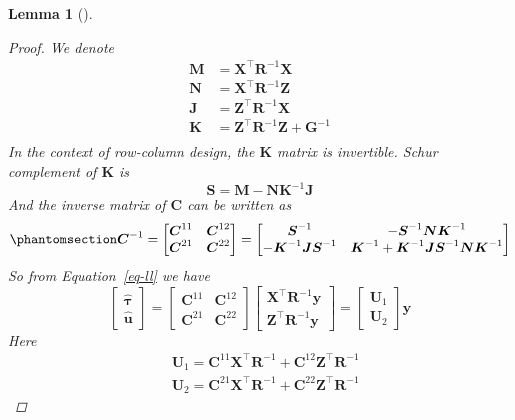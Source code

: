 \documentclass[
  a4paper,
  oneside,
  openany,
  12pt,
  onecolumn]{book}
\theoremstyle{definition}
\theoremstyle{definition}
\theoremstyle{plain}
\newtheorem{lemma}{Lemma}[chapter]
\theoremstyle{remark}
\begin{document}
\begin{lemma}[]
\begin{proof}
We denote \[\begin{aligned}
\boldsymbol{M} &= \boldsymbol{X}^\top \boldsymbol{R}^{-1} \boldsymbol{X}\\
\boldsymbol{N} &= \boldsymbol{X}^\top \boldsymbol{R}^{-1} \boldsymbol{Z}\\
\boldsymbol{J} &= \boldsymbol{Z}^\top \boldsymbol{R}^{-1} \boldsymbol{X}\\
\boldsymbol{K} &= \boldsymbol{Z}^\top \boldsymbol{R}^{-1} \boldsymbol{Z} + \boldsymbol{G}^{-1}\\
\end{aligned}\] In the context of row-column design, the
\(\boldsymbol{K}\) matrix is invertible. Schur complement of
\(\boldsymbol{K}\) is \[
\boldsymbol{S} = \boldsymbol{M} - \boldsymbol{N} \boldsymbol{K}^{-1} \boldsymbol{J}
\] And the inverse matrix of \(\boldsymbol{C}\) can be written as
\begin{equation}\phantomsection\label{eq-iv}{
\boldsymbol{C}^{-1}=
\begin{bmatrix}
\boldsymbol{C}^{11} & \boldsymbol{C}^{12} \\
\boldsymbol{C}^{21} & \boldsymbol{C}^{22}
\end{bmatrix}=
\begin{bmatrix}
\boldsymbol{S}^{-1} & -\boldsymbol{S}^{-1} \boldsymbol{N} \boldsymbol{K}^{-1} \\
-\boldsymbol{K}^{-1} \boldsymbol{J} \boldsymbol{S}^{-1} & \boldsymbol{K}^{-1} + \boldsymbol{K}^{-1} \boldsymbol{J} \boldsymbol{S}^{-1} \boldsymbol{N} \boldsymbol{K}^{-1}
\end{bmatrix}
}\end{equation} So from Equation~\ref{eq-ll} we have \[
\begin{bmatrix}
\hat{\boldsymbol{\tau}} \\
\hat{\boldsymbol{u}}
\end{bmatrix}
=
\begin{bmatrix}
\boldsymbol{C}^{11} & \boldsymbol{C}^{12} \\
\boldsymbol{C}^{21} & \boldsymbol{C}^{22}
\end{bmatrix}
\begin{bmatrix}
\boldsymbol{X}^\top\boldsymbol{R}^{-1}\boldsymbol{y}\\
\boldsymbol{Z}^\top\boldsymbol{R}^{-1}\boldsymbol{y}
\end{bmatrix}
=
\begin{bmatrix}
\boldsymbol{U}_1\\
\boldsymbol{U}_2
\end{bmatrix}\boldsymbol{y}
\] Here \[\begin{aligned}
&\boldsymbol{U}_1 = \boldsymbol{C}^{11}\boldsymbol{X}^\top\boldsymbol{R}^{-1}+\boldsymbol{C}^{12}\boldsymbol{Z}^\top\boldsymbol{R}^{-1}\\
&\boldsymbol{U}_2 = \boldsymbol{C}^{21}\boldsymbol{X}^\top\boldsymbol{R}^{-1}+\boldsymbol{C}^{22}\boldsymbol{Z}^\top\boldsymbol{R}^{-1}
\end{aligned}\]


\end{proof}
\end{lemma}
\end{document}
